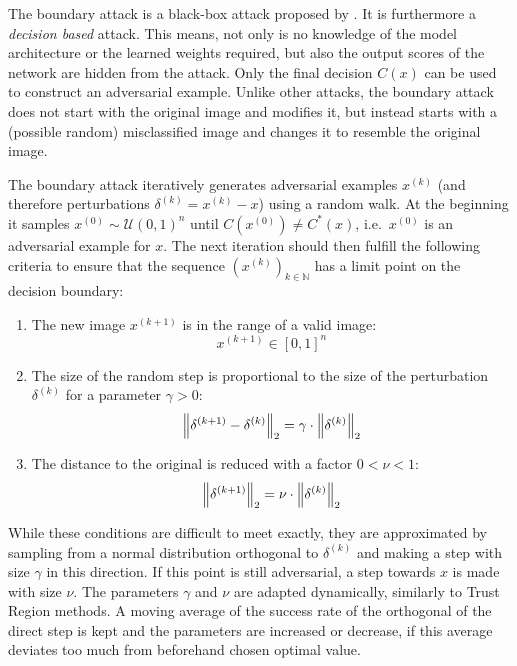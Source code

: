 The boundary attack is a black-box attack proposed by \citet{boundary}. It is furthermore a \emph{decision based} attack. This means, not only is no knowledge of the model architecture or the learned weights required, but also the output scores of the network are hidden from the attack. Only the final decision $C(x)$ can be used to construct an adversarial example.
Unlike other attacks, the boundary attack does not start with the original image and modifies it, but instead starts with a (possible random) misclassified image and changes it to resemble the original image.

The boundary attack iteratively generates adversarial examples $x^{(k)}$ (and therefore perturbations $\delta^{(k)} = x^{(k)} - x$) using a random walk. At the beginning it samples $x^{(0)} \sim \mathcal{U}(0,1)^n$ until $C(x^{(0)}) \neq C^*(x)$, i.e.\ $x^{(0)}$ is an adversarial example for $x$.
The next iteration should then fulfill the following criteria to ensure that the sequence $(x^{(k)})_{k \in \mathbb{N}}$ has a limit point on the decision boundary:

\begin{enumerate}
	\item The new image $x^{(k+1)}$ is in the range of a valid image:
	\begin{equation*}
	x^{(k+1)}\in [0,1]^n
	\end{equation*}
	
	\item The size of the random step is proportional to the size of the perturbation $\delta^{(k)}$ for a parameter $\gamma > 0$:
	\begin{equation*}
	\left \lVert \delta^{(k+1)} - \delta^{(k)} \right \rVert _{2} = \gamma \cdot \left \lVert \delta^{(k)} \right \rVert _{2}
	\end{equation*}
	
	\item The distance to the original is reduced with a factor $0<\nu<1$:
	\begin{equation*}
	\left \lVert \delta^{(k+1)} \right \rVert _{2} = \nu \cdot \left \lVert \delta^{(k)} \right \rVert _{2}
	\end{equation*}
\end{enumerate}

While these conditions are difficult to meet exactly, they are approximated by sampling from a normal distribution orthogonal to $\delta^{(k)}$ and making a step with size $\gamma$ in this direction.
If this point is still adversarial, a step towards $x$ is made with size $\nu$.
The parameters $\gamma$ and $\nu$ are adapted dynamically, similarly to Trust Region \citep{trustregion} methods.
A moving average of the success rate of the orthogonal of the direct step is kept and the parameters are increased or decrease, if this average deviates too much from beforehand chosen optimal value.

